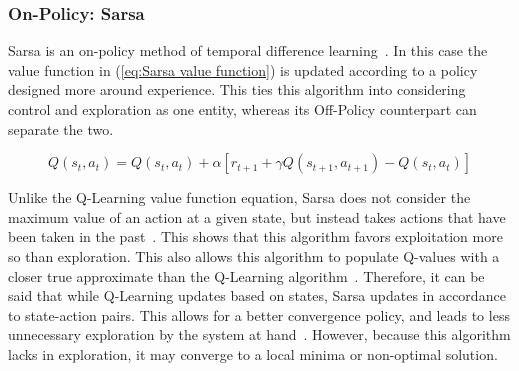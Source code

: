 \documentclass[12pt,american]{report}
\begin{document}
        \subsubsection{On-Policy: Sarsa}
        Sarsa is an on-policy method of temporal difference learning~\cite{sprague2003multiple}. In this case the value function in (\ref{eq:Sarsa value function}) is updated according to a policy designed more around experience.  This ties this algorithm into considering control and exploration as one entity, whereas its Off-Policy counterpart can separate the two.
        
        \begin{equation}
            \label{eq:Sarsa value function}
            Q(s_{t},a_{t}) = Q(s_{t},a_{t}) + \alpha[r_{t+1} + \gamma Q(s_{t+1},a_{t+1})-Q(s_{t},a_{t})]
        \end{equation}
        
        Unlike the Q-Learning value function equation, Sarsa does not consider the maximum value of an action at a given state, but instead takes actions that have been taken in the past~\cite{Eden}. This shows that this algorithm favors exploitation more so than exploration. This also allows this algorithm to populate Q-values with a closer true approximate than the Q-Learning algorithm~\cite{sprague2003multiple}. Therefore, it can be said that while Q-Learning updates based on states, Sarsa updates in accordance to state-action pairs.  This allows for a better convergence policy, and leads to less unnecessary exploration by the system at hand~\cite{sutton1996generalization}.  However, because this algorithm lacks in exploration, it may converge to a local minima or non-optimal solution.
        
\end{document}
